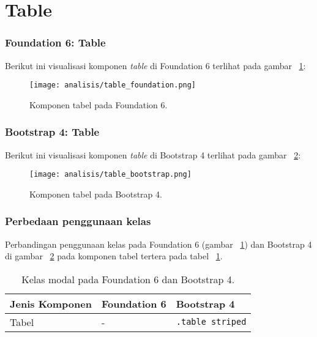 \section{Table}
\subsubsection{Foundation 6: Table}
Berikut ini visualisasi komponen \textit{table} di Foundation 6 terlihat pada gambar ~\ref{fig:tabelFoundation}:
\begin{figure} [H]	
	\centering
	\texttt{[image: analisis/table\_foundation.png]}
	\caption{Komponen tabel pada Foundation 6.}
	\label{fig:tabelFoundation}
\end{figure}

\subsubsection{Bootstrap 4: Table}
Berikut ini visualisasi komponen \textit{table} di Bootstrap 4 terlihat pada gambar ~\ref{fig:tabelBootstrap}:
\begin{figure} [H]
	\centering
	\texttt{[image: analisis/table\_bootstrap.png]}
	\caption{Komponen tabel pada Bootstrap 4.}
	\label{fig:tabelBootstrap}
\end{figure}

\subsubsection{Perbedaan penggunaan kelas}
\noindent Perbandingan penggunaan kelas pada Foundation 6 (gambar ~\ref{fig:tabelFoundation}) dan Bootstrap 4 di gambar ~\ref{fig:tabelBootstrap} pada komponen tabel tertera pada tabel ~\ref{table:tabel}.\\

\begin{table}[H] 
	\caption{Kelas modal pada Foundation 6 dan Bootstrap 4.}
	\begin{tabular}{| p{} | p{} | p{} |} 
		\hline
		\textbf{Jenis Komponen} & \textbf{Foundation 6} & \textbf{Bootstrap 4}  \\ [0.5ex] 
		\hline	
		Tabel & - & \texttt{.table striped}\\[1ex]	
		\hline		
	\end{tabular}
	\label{table:tabel}
\end{table}

